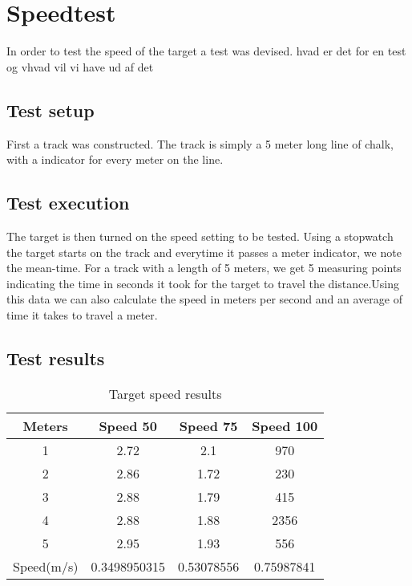 \section{Speedtest}\label{speedotesto}
In order to test the speed of the target a test was devised.
hvad er det for en test og vhvad vil vi have ud af det
\subsection{Test setup}
First a track was constructed. The track is simply a 5 meter long line of chalk,
with a indicator for every meter on the line.
\subsection{Test execution}
The target is then turned on the speed setting to be tested. Using a stopwatch
the target starts on the track and everytime it passes a meter indicator, we note
the mean-time. For a track with a length of 5 meters, we get 5 measuring points indicating
the time in seconds it took for the target to travel the distance.Using this data
we can also calculate the speed in meters per second and an average of time it takes to
travel a meter.
\subsection{Test results}

\begin{table}[ht]
\caption{Target speed results} %
\centering %
\begin{tabular}{c c c c} %
\hline\hline %
Meters & Speed 50 & Speed 75 & Speed 100 \\ [0.5ex] %
\hline %
1 & 2.72 & 2.1 & 970 \\ %
2 & 2.86 & 1.72 & 230 \\
3 & 2.88 & 1.79 & 415 \\
4 & 2.88 & 1.88 & 2356 \\
5 & 2.95 & 1.93 & 556 \\ [1ex] %
\hline %
Speed(m/s) & 0.3498950315 & 0.53078556 & 0.75987841 \\
\end{tabular}
\label{table:speed} %
\end{table}
